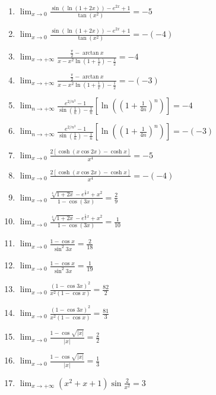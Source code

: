 \documentclass[11pt,a4paper]{article}
\begin{document}
\begin{enumerate}
\item $\displaystyle \lim_{x \to 0} \frac{\sin(\ln(1 + 2x)) - e^{2x} + 1}{\tan(x^{2})} = -5$
\item $\displaystyle \lim_{x \to 0} \frac{\sin(\ln(1 + 2x)) - e^{2x} + 1}{\tan(x^{2})} = -\left(-4\right)$
\item $\displaystyle \lim_{x \to +\infty} \frac{\frac{\pi}{2} - \arctan x}{x - x^{2}\ln\left(1 + \frac{1}{x}\right) - \frac{1}{2}} = -4$
\item $\displaystyle \lim_{x \to +\infty} \frac{\frac{\pi}{2} - \arctan x}{x - x^{2}\ln\left(1 + \frac{1}{x}\right) - \frac{1}{2}} = -\left(-3\right)$
\item $\displaystyle \lim_{n \to +\infty} \frac{e^{2/n^{3}} - 1}{\sin\left(\frac{1}{n}\right) - \frac{1}{n}}\left[\ln\left(\left(1 + \frac{1}{4n}\right)^{n}\right)\right] = -4$
\item $\displaystyle \lim_{n \to +\infty} \frac{e^{2/n^{3}} - 1}{\sin\left(\frac{1}{n}\right) - \frac{1}{n}}\left[\ln\left(\left(1 + \frac{1}{4n}\right)^{n}\right)\right] = -\left(-3\right)$
\item $\displaystyle \lim_{x \to 0} \frac{2\left[\cosh(x\cos 2x) - \cosh x\right]}{x^{4}} = -5$
\item $\displaystyle \lim_{x \to 0} \frac{2\left[\cosh(x\cos 2x) - \cosh x\right]}{x^{4}} = -\left(-4\right)$
\item $\displaystyle \lim_{x \to 0} \frac{\sqrt[4]{1 + 2x} - e^{\frac{1}{2}x} + x^{2}}{1 - \cos(3x)} = \frac{2}{9}$
\item $\displaystyle \lim_{x \to 0} \frac{\sqrt[4]{1 + 2x} - e^{\frac{1}{2}x} + x^{2}}{1 - \cos(3x)} = \frac{1}{10}$
\item $\displaystyle \lim_{x \to 0} \frac{1 - \cos x}{\sin^{2} 3x} = \frac{2}{18}$
\item $\displaystyle \lim_{x \to 0} \frac{1 - \cos x}{\sin^{2} 3x} = \frac{1}{19}$
\item $\displaystyle \lim_{x \to 0} \frac{(1 - \cos 3x)^{2}}{x^{2}(1 - \cos x)} = \frac{82}{2}$
\item $\displaystyle \lim_{x \to 0} \frac{(1 - \cos 3x)^{2}}{x^{2}(1 - \cos x)} = \frac{81}{3}$
\item $\displaystyle \lim_{x \to 0} \frac{1 - \cos\sqrt{\left|x\right|}}{\left|x\right|} = \frac{2}{2}$
\item $\displaystyle \lim_{x \to 0} \frac{1 - \cos\sqrt{\left|x\right|}}{\left|x\right|} = \frac{1}{3}$
\item $\displaystyle \lim_{x \to +\infty} (x^{2} + x + 1)\sin\frac{2}{x^{2}} = 3$

\end{enumerate}
\end{document}
